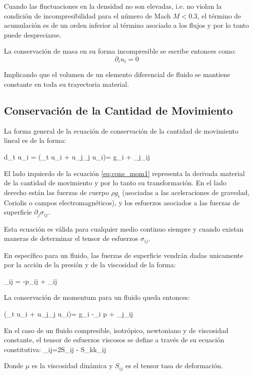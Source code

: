 Cuando las fluctuaciones en la densidad no son elevadas, i.e. no violan la condición de incompresibilidad para el número de Mach $M<0.3$, el término de acumulación es de un orden inferior al término asociado a los flujos y por lo tanto puede despreciarse.

La conservación de masa en su forma incompresible se escribe entonces como:
\begin{equation}
\partial_i u_i =0
\end{equation}

Implicando que el volumen de un elemento diferencial de fluido se mantiene constante en toda su trayectoria material.
\subsection{Conservación de la Cantidad de Movimiento}
La forma general de la ecuación de conservación de la cantidad de movimiento lineal es de la forma:

\be\label{eq:cons_mom1}
\rho d_t u_i = \rho(\partial_t u_i + u_j\partial_j u_i)= \rho g_i + \partial_j\sigma_{ij}
\ee

El lado izquierdo de la ecuación \ref{eq:cons_mom1} representa la derivada material de la cantidad de movimiento y por lo tanto su transformación. En el lado derecho están las fuerzas de cuerpo $\rho g_i$ (asociadas a las aceleraciones de gravedad, Coriolis o campos electromagnéticos), y los esfuerzos asociados a las fuerzas de superficie $\partial_j \sigma_{ij}$. 

Esta ecuación es válida para cualquier medio continuo siempre y cuando existan maneras de determinar el tensor de esfuerzos $\sigma_{ij}$.

En específico para un fluido, las fuerzas de superficie vendrán dadas unicamente por la acción de la presión y de la viscosidad de la forma:

\be
\sigma_{ij} = -p\delta_{ij} + \tau_{ij}
\ee 

La conservación de momentum para un fluido queda entonces:

\be\label{eq:cons_mom}
\rho(\partial_t u_i + u_j\partial_j u_i)= \rho g_i -\partial_i p + \partial_j\tau_{ij}
\ee

En el caso de un fluido compresible, isotrópico, newtoniano y de viscosidad constante, el tensor de esfuerzos viscosos se define a través de su ecuación constitutiva:
\be
\tau_{ij}=2\mu S_{ij} - \mu S_{kk}\delta_{ij}
\ee

Donde $\mu$ es la viscosidad dinámica y $S_{ij}$ es el tensor tasa de deformación.

